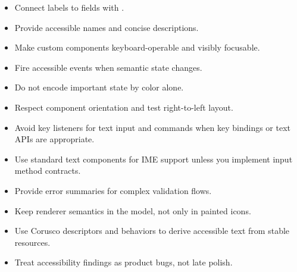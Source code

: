 \begin{itemize}
\item Connect labels to fields with .
\item Provide accessible names and concise descriptions.
\item Make custom components keyboard-operable and visibly focusable.
\item Fire accessible events when semantic state changes.
\item Do not encode important state by color alone.
\item Respect component orientation and test right-to-left layout.
\item Avoid key listeners for text input and commands when key bindings or text APIs are appropriate.
\item Use standard text components for IME support unless you implement input method contracts.
\item Provide error summaries for complex validation flows.
\item Keep renderer semantics in the model, not only in painted icons.
\item Use Corusco descriptors and behaviors to derive accessible text from stable resources.
\item Treat accessibility findings as product bugs, not late polish.
\end{itemize}
